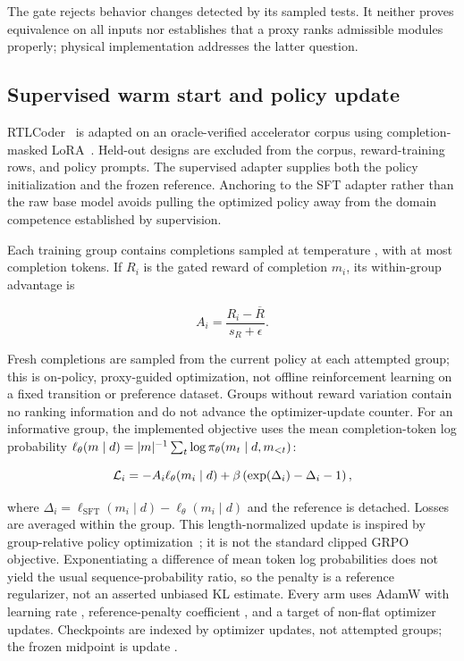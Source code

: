 The gate rejects behavior changes detected by its sampled tests.  It neither
proves equivalence on all inputs nor establishes that a proxy ranks admissible
modules properly; physical implementation addresses the latter question.

\subsection{Supervised warm start and policy update}

RTLCoder~\cite{liu2024rtlcoder} is adapted on an oracle-verified accelerator
corpus using completion-masked LoRA~\cite{hu2022lora}.  Held-out designs are
excluded from the corpus, reward-training rows, and policy prompts.  The
supervised adapter supplies both the policy initialization and the frozen
reference.  Anchoring to the SFT adapter rather than the raw base model avoids
pulling the optimized policy away from the domain competence established by
supervision.

Each training group contains  completions sampled
at temperature , with at most
 completion tokens.  If $R_i$ is the
gated reward of completion $m_i$, its within-group advantage is

\begin{equation}
A_i=\frac{R_i-\overline{R}}{s_R+\epsilon}.
\label{eq:advantage}
\end{equation}

Fresh completions are sampled from the current policy at each attempted group;
this is on-policy, proxy-guided optimization, not offline reinforcement
learning on a fixed transition or preference dataset.
Groups without reward variation contain no ranking information and do not
advance the optimizer-update counter.  For an informative group, the
implemented objective uses the mean completion-token log probability
$\ell_\theta(m\mid d)=|m|^{-1}\sum_t
\log\pi_\theta(m_t\mid d,m_{<t})$:

\begin{equation}
\mathcal{L}_i=-A_i\ell_\theta(m_i\mid d)
+\beta\left(\exp(\Delta_i)-\Delta_i-1\right),
\label{eq:policy-loss}
\end{equation}

where $\Delta_i=\ell_{\mathrm{SFT}}(m_i\mid d)-
\ell_\theta(m_i\mid d)$ and the reference is detached.  Losses are averaged
within the group.  This length-normalized update is inspired by group-relative
policy optimization~\cite{shao2024deepseekmath}; it is not the standard clipped
GRPO objective.  Exponentiating a difference of mean token log probabilities
does not yield the usual sequence-probability ratio, so the penalty is a
reference regularizer, not an asserted unbiased KL estimate.
Every arm uses AdamW with learning rate
, reference-penalty coefficient
, and a target of
 non-flat optimizer updates.  Checkpoints
are indexed by optimizer updates, not attempted groups; the frozen midpoint is
update .

